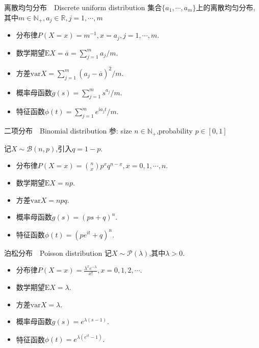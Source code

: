 \begin{frame}{离散均匀分布$\quad$Discrete uniform distribution}
	集合$\{a_1,\cdots,a_m\}$上的离散均匀分布,其中$m\in\mathbb{N}_+,a_j\in\mathbb{R},j=1,\cdots,m$
	
	\begin{itemize}
		\item 分布律$P(X=x) = m^{-1},x = a_j,j=1,\cdots,m.$
		\item 数学期望$\mathrm{E}X = \overline{a} = \sum_{j=1}^m a_j/m.$
		\item 方差$\mathrm{var}X = \sum_{j=1}^m (a_j-\overline{a})^2/m.$
		\item 概率母函数$g(s) = \sum_{j=1}^m s^{a_j}/m.$
		\item 特征函数$\phi(t) = \sum_{j=1}^m e^{ia_jt}/m.$
	\end{itemize}
\end{frame}

\begin{frame}{二项分布$\quad$Binomial distribution}
	参: size $n\in\mathbb{N}_+$,probability $p\in[0,1]$
	
	记$X\sim\mathcal{B}(n,p)$,引入$q=1-p$.
	\begin{itemize}
		\item 分布律$P(X=x) = \binom{n}{x}p^xq^{n-x},x = 0,1,\cdots,n.$
		\item 数学期望$\mathrm{E}X = np.$
		\item 方差$\mathrm{var}X = npq.$
		\item 概率母函数$g(s) = (ps+q)^n.$
		\item 特征函数$\phi(t) = (pe^{it}+q)^n.$
	\end{itemize}
\end{frame}

\begin{frame}{泊松分布$\quad$Poisson distribution}
	记$X\sim\mathcal{P}(\lambda)$,其中$\lambda>0$.
	
	\begin{itemize}
		\item 分布律$P(X=x) = \frac{\lambda^x e^{-\lambda}}{x!},x = 0,1,2,\cdots.$
		\item 数学期望$\mathrm{E}X = \lambda.$
		\item 方差$\mathrm{var}X = \lambda.$
		\item 概率母函数$g(s) = e^{\lambda (s-1)}.$
		\item 特征函数$\phi(t) = e^{\lambda (e^{it}-1)}.$
	\end{itemize}
\end{frame}

